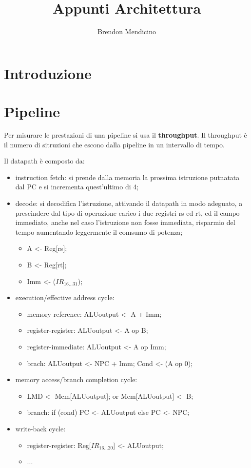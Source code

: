 \documentclass[12pt]{article}
\title{Appunti Architettura}
\author{Brendon Mendicino}
\begin{document}
\maketitle
\newpage
\tableofcontents
\newpage


\section{Introduzione}\label{sec:introduzione}

\section{Pipeline}
Per misurare le prestazioni di una pipeline si usa il \textbf{throughput}. Il throughput \`e il numero di sitruzioni che escono dalla pipeline in un intervallo di tempo.

Il datapath \`e composto da:
\begin{itemize}
    \item instruction fetch: si prende dalla memoria la prossima istruzione putnatata dal PC e si incrementa quest'ultimo di 4;
    \item decode: si decodifica l'istruzione, attivando il datapath in modo adeguato, a prescindere dal tipo di operazione carico i due registri rs ed rt, ed il campo immediato, anche nel caso l'istruzione non fosse immediata, risparmio del tempo aumentando leggermente il comsumo di potenza;
    \begin{itemize}
        \item A <- Reg[rs];
        \item B <- Reg[rt];
        \item Imm <- ($IR_{16\dots 31}$);
    \end{itemize}
    \item execution/effective address cycle: 
        \begin{itemize}
            \item memory reference: ALUoutput <- A + Imm;
            \item register-register: ALUoutput <- A op B;
            \item register-immediate: ALUoutput <- A op Imm;
            \item brach: ALUoutput <- NPC + Imm; Cond <- (A op 0);
        \end{itemize}
    \item memory access/branch completion cycle:
        \begin{itemize}
            \item LMD <- Mem[ALUoutput]; or Mem[ALUoutput] <- B;
            \item branch: if (cond) PC <- ALUoutput else PC <- NPC;
        \end{itemize}
    \item write-back cycle:
        \begin{itemize}
            \item register-register: Reg[$IR_{16\dots 20}$] <- ALUoutput;
            \item ...
        \end{itemize}
\end{itemize}
\end{document}
